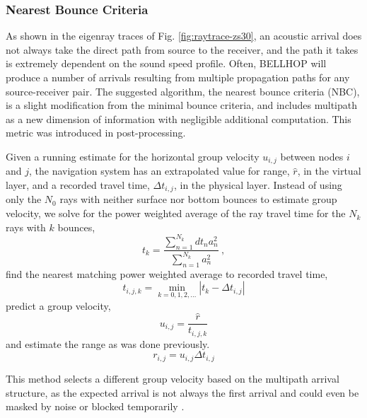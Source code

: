 \subsubsection{Nearest Bounce Criteria}

As shown in the eigenray traces of Fig. \ref{fig:raytrace-zs30}, an acoustic arrival does not always take the direct path from source to the receiver, and the path it takes is extremely dependent on the sound speed profile.
Often, BELLHOP will produce a number of arrivals resulting from multiple propagation paths for any source-receiver pair.
The suggested algorithm, the nearest bounce criteria (NBC), is a slight modification from the minimal bounce criteria, and includes multipath as a new dimension of information with negligible additional computation.
This metric was introduced in post-processing.

Given a running estimate for the horizontal group velocity $u_{i,j}$ between nodes $i$ and $j$, the navigation system has an extrapolated value for range, $\hat{r}$, in the virtual layer, and a recorded travel time, $\Delta t_{i,j}$, in the physical layer.
Instead of using only the $N_0$ rays with neither surface nor bottom bounces to estimate group velocity, we solve for the power weighted average of the ray travel time for the $N_k$ rays with $k$ bounces,
\begin{equation}
t_k = \frac{\sum_{n=1}^{N_{k}} dt_{n}a_{n}^{2}}{\sum_{n=1}^{N_{k}} a_{n}^{2}} ~, 
\end{equation}
find the nearest matching power weighted average to recorded travel time,
\begin{equation}
t_{i,j,k} = \min_{k=0,1,2,...} \left| t_k - \Delta t_{i,j} \right|
\end{equation}
predict a group velocity,
\begin{equation}
u_{i,j} = \dfrac{\hat{r}}{t_{i,j,k}}
\end{equation}
and estimate the range as was done previously.
\begin{equation}
r_{i,j} = u_{i,j}\Delta t_{i,j}
\end{equation}

This method selects a different group velocity based on the multipath arrival structure, as the expected arrival is not always the first arrival and could even be masked by noise or blocked temporarily \citep{deffenbaugh_acoustic_1996}.



